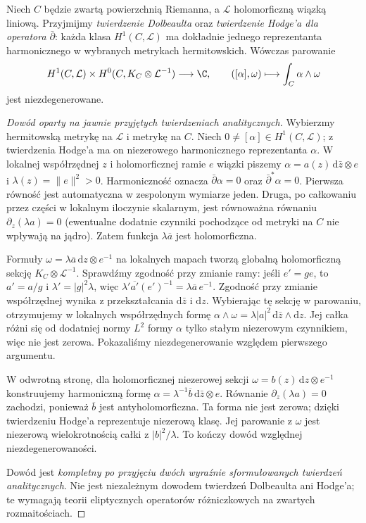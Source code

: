 \begin{twierdzenie}
\label{tw:serre-hodge-dependent}
Niech $C$ będzie zwartą powierzchnią Riemanna,
a $\mathcal L$ holomorficzną wiązką liniową.
Przyjmijmy \emph{twierdzenie Dolbeaulta} oraz
\emph{twierdzenie Hodge'a dla operatora $\bar\partial$}:
każda klasa $H^1(C,\mathcal L)$ ma dokładnie jednego
reprezentanta harmonicznego w wybranych metrykach
hermitowskich. Wówczas parowanie
\[
H^1(C,\mathcal L)\times
H^0(C,K_C\otimes\mathcal L^{-1})\longrightarrow\C,
\qquad([\alpha],\omega)\longmapsto
\int_C\alpha\wedge\omega
\]
jest niezdegenerowane.
\end{twierdzenie}
\begin{proof}[Dowód oparty na jawnie przyjętych twierdzeniach analitycznych]
Wybierzmy hermitowską metrykę na $\mathcal L$ i metrykę
na $C$. Niech $0\ne[\alpha]\in H^1(C,\mathcal L)$;
z twierdzenia Hodge'a ma on niezerowego harmonicznego
reprezentanta $\alpha$. W lokalnej współrzędnej $z$
i holomorficznej ramie $e$ wiązki piszemy
$\alpha=a(z)\,\mathrm d\bar z\otimes e$ i
$\lambda(z)=\lVert e\rVert^2>0$.
Harmoniczność oznacza $\bar\partial\alpha=0$ oraz
$\bar\partial^*\alpha=0$. Pierwsza równość jest
automatyczna w zespolonym wymiarze jeden.
Druga, po całkowaniu przez części w lokalnym iloczynie
skalarnym, jest równoważna równaniu
$\partial_z(\lambda a)=0$ (ewentualne dodatnie czynniki
pochodzące od metryki na $C$ nie wpływają na jądro).
Zatem funkcja $\lambda\overline a$ jest holomorficzna.

Formuły $\omega=\lambda\overline a\,\mathrm dz\otimes e^{-1}$
na lokalnych mapach tworzą globalną holomorficzną
sekcję $K_C\otimes\mathcal L^{-1}$. Sprawdźmy zgodność
przy zmianie ramy: jeśli $e'=g e$, to
$a'=a/g$ i $\lambda'=|g|^2\lambda$,
więc $\lambda'\overline{a'}(e')^{-1}
=\lambda\overline a\,e^{-1}$. Zgodność przy zmianie
współrzędnej wynika z przekształcania
$\mathrm d\bar z$ i $\mathrm dz$.
Wybierając tę sekcję w parowaniu, otrzymujemy
w lokalnych współrzędnych formę
$\alpha\wedge\omega=
\lambda|a|^2\,\mathrm d\bar z\wedge\mathrm dz$.
Jej całka różni się od dodatniej normy $L^2$ formy
$\alpha$ tylko stałym niezerowym czynnikiem,
więc nie jest zerowa. Pokazaliśmy niezdegenerowanie
względem pierwszego argumentu.

W odwrotną stronę, dla holomorficznej niezerowej
sekcji $\omega=b(z)\,\mathrm dz\otimes e^{-1}$
konstruujemy harmoniczną formę
$\alpha=\lambda^{-1}\overline b\,\mathrm d\bar z\otimes e$.
Równanie $\partial_z(\lambda a)=0$ zachodzi, ponieważ
$\overline b$ jest antyholomorficzna. Ta forma nie
jest zerowa; dzięki twierdzeniu Hodge'a reprezentuje
niezerową klasę. Jej parowanie z $\omega$ jest
niezerową wielokrotnością całki z $|b|^2/\lambda$.
To kończy dowód względnej niezdegenerowaności.

Dowód jest \emph{kompletny po przyjęciu dwóch
wyraźnie sformułowanych twierdzeń analitycznych}.
Nie jest niezależnym dowodem twierdzeń Dolbeaulta
ani Hodge'a; te wymagają teorii eliptycznych
operatorów różniczkowych na zwartych rozmaitościach.
\end{proof}

